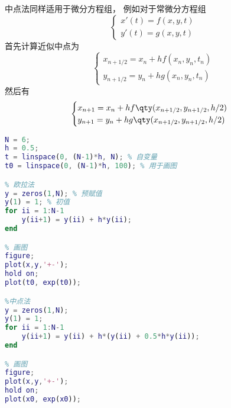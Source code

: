 中点法同样适用于微分方程组， 例如对于常微分方程组
\begin{equation}
\begin{cases}
x'(t) = f(x, y, t)\\
y'(t) = g(x, y, t)
\end{cases}
\end{equation}
首先计算近似中点为
\begin{equation}
\begin{cases}
x_{n+1/2} = x_n + h f(x_n, y_n, t_n)\\
y_{n+1/2} = y_n + h g(x_n, y_n, t_n)
\end{cases}
\end{equation}
然后有
\begin{equation}\label{OdeMid_eq7}
\begin{cases}
x_{n+1} = x_n + h f \qty(x_{n+1/2}, y_{n+1/2}, h/2)\\
y_{n+1} = y_n + h g \qty(x_{n+1/2}, y_{n+1/2}, h/2)
\end{cases}
\end{equation}

\begin{lstlisting}[language=matlab, caption=odeMid.m]
% 设置参数
N = 6;
h = 0.5;
t = linspace(0, (N-1)*h, N); % 自变量
t0 = linspace(0, (N-1)*h, 100); % 用于画图

% 欧拉法
y = zeros(1,N); % 预赋值
y(1) = 1; % 初值
for ii = 1:N-1
    y(ii+1) = y(ii) + h*y(ii);
end

% 画图
figure;
plot(x,y,'+-');
hold on;
plot(t0, exp(t0));

%中点法
y = zeros(1,N);
y(1) = 1;
for ii = 1:N-1
    y(ii+1) = y(ii) + h*(y(ii) + 0.5*h*y(ii));
end

% 画图
figure;
plot(x,y,'+-');
hold on;
plot(x0, exp(x0));
\end{lstlisting}
